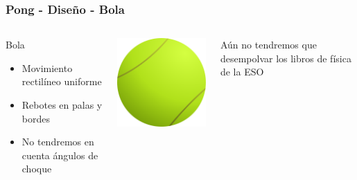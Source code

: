 \begin{frame}
	\frametitle{Pong - Diseño - Bola}
	
	\begin{columns}[c]
	\column{175pt}	
	
	\begin{block}{Bola}
		\begin{itemize}
			\item Movimiento rectilíneo uniforme
			\item Rebotes en palas y bordes
			\item No tendremos en cuenta ángulos de choque
		\end{itemize}            
	\end{block}
	
	\column{125pt}
	
	\begin{center}
		\includegraphics[scale=0.4]{img/pelota.png}
	\end{center}	
	
	\begin{center}
	    Aún no tendremos que desempolvar los libros de física de la ESO
	\end{center}
	
	\end{columns}
	
\end{frame}

